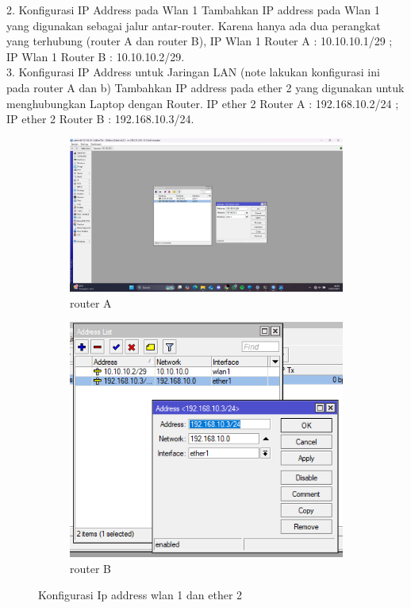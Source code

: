 2. Konfigurasi IP Address pada Wlan 1 Tambahkan IP address pada Wlan 1 yang digunakan sebagai jalur antar-router. Karena hanya ada dua perangkat yang terhubung (router A dan router B), IP Wlan 1 Router A : 10.10.10.1/29 ; IP Wlan 1 Router B : 10.10.10.2/29. \\ 
3. Konfigurasi IP Address untuk Jaringan LAN (note lakukan konfigurasi ini pada router A dan b) Tambahkan IP address pada ether 2 yang digunakan untuk menghubungkan Laptop dengan Router. IP ether 2 Router A : 192.168.10.2/24 ; IP ether 2 Router B : 192.168.10.3/24.
\begin{figure}[H]
    \centering
    \begin{subfigure}[b]{0.3\linewidth}
      \centering
      \includegraphics[width=\linewidth]{image/wb4.jpg}
      \caption{router A}
    \end{subfigure}
    \hspace{1cm}
    \begin{subfigure}[b]{0.3\linewidth}
      \centering
      \includegraphics[width=\linewidth]{image/wb1.png}
      \caption{router B}
    \end{subfigure}
    \caption{Konfigurasi Ip address wlan 1 dan ether 2}
\end{figure}

